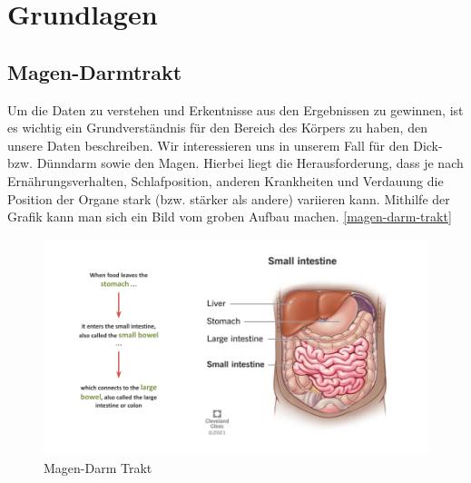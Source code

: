\section{Grundlagen}\raggedbottom

\subsection{Magen-Darmtrakt}

Um die Daten zu verstehen und Erkentnisse aus den Ergebnissen zu gewinnen, ist es wichtig ein Grundverständnis für den Bereich des Körpers zu haben, den unsere Daten beschreiben. Wir interessieren uns in unserem Fall für den Dick- bzw. Dünndarm sowie den Magen. Hierbei liegt die Herausforderung, dass je nach Ernährungsverhalten, Schlafposition, anderen Krankheiten und Verdauung die Position der Organe stark (bzw. stärker als andere) variieren kann. Mithilfe der Grafik kann man sich ein Bild vom groben Aufbau machen. \autoref{magen-darm-trakt}

\begin{figure}[htb]
	\begin{center}
		\includegraphics[width=450pt]{bilder/intestines}
		\caption{Magen-Darm Trakt}\label{magen-darm-trakt}
	\end{center}
\end{figure}

